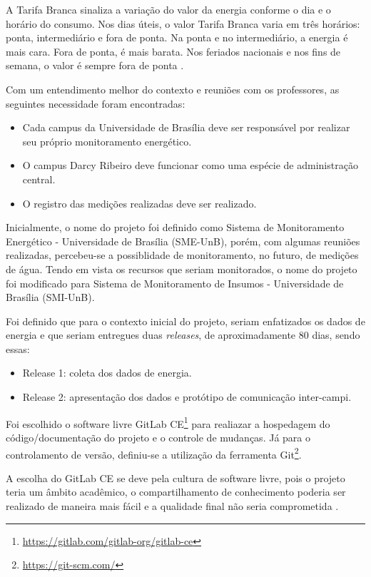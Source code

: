 A Tarifa Branca sinaliza a variação do valor da energia conforme o dia e o horário do consumo. Nos dias úteis, o valor Tarifa Branca varia em três horários: ponta, intermediário e fora de ponta. Na ponta e no intermediário, a energia é mais cara. Fora de ponta, é mais barata. Nos feriados nacionais e nos fins de semana, o valor é sempre fora de ponta \cite{aneel}.

Com um entendimento melhor do contexto e reuniões com os professores, as seguintes necessidade foram encontradas:

\begin{itemize}
    \item Cada campus da Universidade de Brasília deve ser responsável por realizar seu próprio monitoramento energético.
    \item O campus Darcy Ribeiro deve funcionar como uma espécie de administração central.
    \item O registro das medições realizadas deve ser realizado.
\end{itemize}

Inicialmente, o nome do projeto foi definido como Sistema de Monitoramento Energético - Universidade de Brasília (SME-UnB), porém, com algumas reuniões realizadas, percebeu-se a possiblidade de monitoramento, no futuro, de medições de água. Tendo em vista os recursos que seriam monitorados, o nome do projeto foi modificado para Sistema de Monitoramento de Insumos - Universidade de Brasília (SMI-UnB).

Foi definido que para o contexto inicial do projeto, seriam enfatizados os dados de energia e que seriam entregues duas \textit{releases}, de aproximadamente 80 dias, sendo essas:

\begin{itemize}
    \item Release 1: coleta dos dados de energia.
    \item Release 2: apresentação dos dados e protótipo de comunicação inter-campi.
\end{itemize}

Foi escolhido o software livre GitLab CE\footnote{\url{https://gitlab.com/gitlab-org/gitlab-ce}} para realiazar a hospedagem do código/documentação do projeto e o controle de mudanças. Já para o controlamento de versão, definiu-se a utilização da ferramenta Git\footnote{\url{https://git-scm.com/}}.

A escolha do GitLab CE se deve pela cultura de software livre, pois o projeto teria um âmbito acadêmico, o compartilhamento de conhecimento poderia ser realizado de maneira mais fácil e a qualidade final não seria comprometida \cite{raymond1999}.

